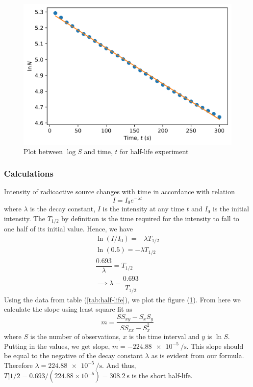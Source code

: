 \documentclass[%
 reprint,
nofootinbib,
 amsmath,amssymb,
 aps,
floatfix,
]{revtex4-2}
\begin{document}
        \begin{figure}
            \centering
            \includegraphics[scale = 0.63]{Figures/plot-half-life.png}
            \caption{Plot between $\log S$ and time, $t$ for half-life experiment}
            \label{fig:half-life}
        \end{figure}
        \subsubsection{Calculations}
        Intensity of radioactive source changes with time in accordance with relation
        \begin{equation}
            I = I_0 e^{-\lambda t}
        \end{equation}
        where $\lambda$ is the decay constant, $I$ is the intensity at any time $t$ and $I_0$ is the initial intensity. The $T_{1/2}$ by definition is the time required for the intensity to fall to one half of its initial value. Hence, we have
        \begin{equation}
            \begin{split}
                \ln (I/I_0) = -\lambda T_{1/2} \\
                \ln(0.5) = -\lambda T_{1/2} \\
                \dfrac{0.693}{\lambda} = T_{1/2} \\
                \implies \lambda = \dfrac{0.693}{T_{1/2}}
            \end{split}
        \end{equation}
        Using the data from table (\ref{tab:half-life}), we plot the figure (\ref{fig:half-life}). From here we calculate the slope using least square fit as
        \begin{equation}
        \label{slope}
            m = \dfrac{S S_{xy} - S_{x}S_{y}}{S S_{xx} - S_{x}^2}
        \end{equation}
        where $S$ is the number of observations, $x$ is the time interval and $y$ is $\ln S$. Putting in the values, we get slope, $m = \SI{-224.88e-5}{\per \second}$. This slope should be equal to the negative of the decay constant $\lambda$ as is evident from our formula. Therefore $\lambda = \SI{224.88e-5}{\per \second}$. And thus, $T|{1/2} = 0.693/(224.88 \times 10^{-5}) = \SI{308.2}{\second}$ is the short half-life.
\end{document}
